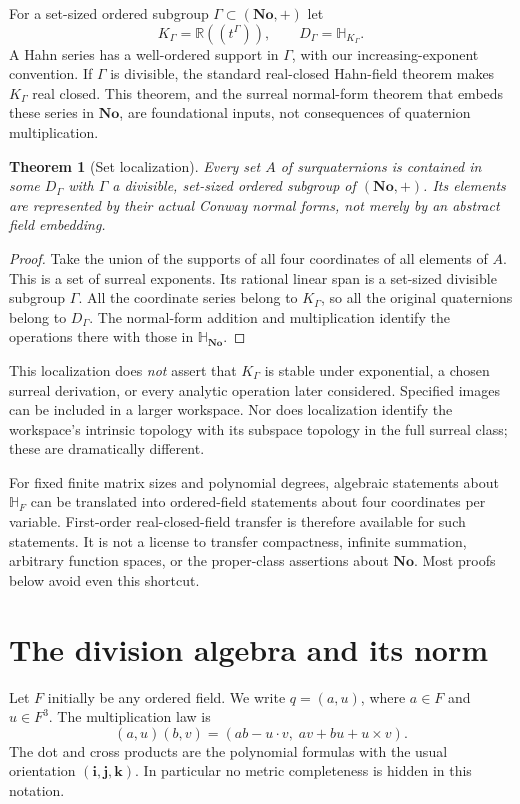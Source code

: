 \documentclass[11pt,letterpaper]{article}
\numberwithin{equation}{section}
\newtheorem{theorem}{Theorem}[section]
\theoremstyle{definition}
\theoremstyle{remark}
\newcommand{\No}{\mathbf{No}}
\newcommand{\SQ}{\mathbb H_{\No}}
\newcommand{\HF}{\mathbb H_F}
\newcommand{\R}{\mathbb R}
\newcommand{\ii}{\mathbf i}
\newcommand{\jj}{\mathbf j}
\newcommand{\kk}{\mathbf k}
\begin{document}
For a set-sized ordered subgroup $\Gamma\subset(\No,+)$ let
\[
 K_\Gamma=\R((t^\Gamma)),\qquad D_\Gamma=\mathbb H_{K_\Gamma}.
\]
A Hahn series has a well-ordered support in $\Gamma$, with our increasing-exponent convention.
If $\Gamma$ is divisible, the standard real-closed Hahn-field theorem makes $K_\Gamma$ real
closed. This theorem, and the surreal normal-form theorem that embeds these series in $\No$,
are foundational inputs, not consequences of quaternion multiplication.

\begin{theorem}[Set localization]\label{thm:localization}
Every set $A$ of surquaternions is contained in some $D_\Gamma$ with $\Gamma$ a divisible,
set-sized ordered subgroup of $(\No,+)$. Its elements are represented by their actual Conway
normal forms, not merely by an abstract field embedding.
\end{theorem}
\begin{proof}
Take the union of the supports of all four coordinates of all elements of $A$. This is a set
of surreal exponents. Its rational linear span is a set-sized divisible subgroup $\Gamma$.
All the coordinate series belong to $K_\Gamma$, so all the original quaternions belong to
$D_\Gamma$. The normal-form addition and multiplication identify the operations there with
those in $\SQ$.
\end{proof}

This localization does \emph{not} assert that $K_\Gamma$ is stable under exponential,
a chosen surreal derivation, or every analytic operation later considered. Specified images
can be included in a larger workspace. Nor does localization identify the workspace's intrinsic
topology with its subspace topology in the full surreal class; these are dramatically different.

For fixed finite matrix sizes and polynomial degrees, algebraic statements about $\HF$ can be
translated into ordered-field statements about four coordinates per variable. First-order
real-closed-field transfer is therefore available for such statements. It is not a license to
transfer compactness, infinite summation, arbitrary function spaces, or the proper-class
assertions about $\No$. Most proofs below avoid even this shortcut.

\section{The division algebra and its norm}\label{sec:algebra}

Let $F$ initially be any ordered field. We write $q=(a,u)$, where $a\in F$ and $u\in F^3$.
The multiplication law is
\begin{equation}\label{eq:product}
 (a,u)(b,v)=(ab-u\cdot v,\;av+bu+u\times v).
\end{equation}
The dot and cross products are the polynomial formulas with the usual orientation
$(\ii,\jj,\kk)$. In particular no metric completeness is hidden in this notation.
\end{document}

